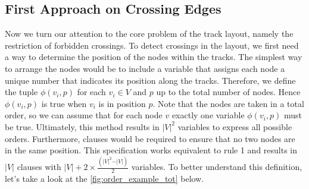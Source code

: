\documentclass[bachelor, english]{algothesis}
\begin{document}
\subsection{First Approach on Crossing Edges}
Now we turn our attention to the core problem of the track layout, namely the restriction of forbidden crossings. To detect crossings in the layout, we first need a way to determine the position of the nodes within the tracks. The simplest way to arrange the nodes would be to include a variable that assigns each node a unique number that indicates its position along the tracks. Therefore, we define the tuple $\phi(v_i,p)$ for each $v_i \in V$ and $p$ up to the total number of nodes. Hence $\phi(v_i,p)$ is true when $v_i$ is in position $p$. Note that the nodes are taken in a total order, so we can assume that for each node $v$ exactly one variable $\phi(v_i,p)$ must be true. Ultimately, this method results in ${\vert V \vert}^2$ variables to express all possible orders. Furthermore, clauses would be required to ensure that no two nodes are in the same position. This specification works equivalent to rule 1 and results in $\vert V \vert$ clauses with $\vert V \vert + 2 \times \frac{(\vert V \vert^2-\vert V \vert)}{2}$ variables. To better understand this definition, let's take a look at the \cref{fig:order_example_tot} below.
\end{document}

